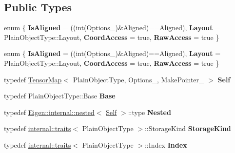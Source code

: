 \subsection*{Public Types}
\begin{DoxyCompactItemize}
\item 
\mbox{\label{class_eigen_1_1_tensor_map_af6f781fd280e420394f24b05604b1281}} 
enum \{ {\bfseries Is\+Aligned} = ((int(Options\+\_\+)\&Aligned)==Aligned), 
{\bfseries Layout} = Plain\+Object\+Type\+:\+:Layout, 
{\bfseries Coord\+Access} = true, 
{\bfseries Raw\+Access} = true
 \}
\item 
\mbox{\label{class_eigen_1_1_tensor_map_a983093493992c86b7d0101a971b61f26}} 
enum \{ {\bfseries Is\+Aligned} = ((int(Options\+\_\+)\&Aligned)==Aligned), 
{\bfseries Layout} = Plain\+Object\+Type\+:\+:Layout, 
{\bfseries Coord\+Access} = true, 
{\bfseries Raw\+Access} = true
 \}
\item 
\mbox{\label{class_eigen_1_1_tensor_map_a977bb3cd8718b16bec8f31512c5c71f1}} 
typedef \hyperlink{class_eigen_1_1_tensor_map}{Tensor\+Map}$<$ Plain\+Object\+Type, Options\+\_\+, Make\+Pointer\+\_\+ $>$ {\bfseries Self}
\item 
\mbox{\label{class_eigen_1_1_tensor_map_a93f442513f01319c29bd90fcc2e6e6f5}} 
typedef Plain\+Object\+Type\+::\+Base {\bfseries Base}
\item 
\mbox{\label{class_eigen_1_1_tensor_map_a42dc567f9a5a5a75099aeca66982b054}} 
typedef \hyperlink{struct_eigen_1_1internal_1_1nested}{Eigen\+::internal\+::nested}$<$ \hyperlink{class_eigen_1_1_tensor_map}{Self} $>$\+::type {\bfseries Nested}
\item 
\mbox{\label{class_eigen_1_1_tensor_map_a9de04f8c9f73a456268cc0998bf798d6}} 
typedef \hyperlink{struct_eigen_1_1internal_1_1traits}{internal\+::traits}$<$ Plain\+Object\+Type $>$\+::Storage\+Kind {\bfseries Storage\+Kind}
\item 
\mbox{\label{class_eigen_1_1_tensor_map_ad4ffcc95e793688f3c5c58f90ccbd476}} 
typedef \hyperlink{struct_eigen_1_1internal_1_1traits}{internal\+::traits}$<$ Plain\+Object\+Type $>$\+::Index {\bfseries Index}

\end{DoxyCompactItemize}
